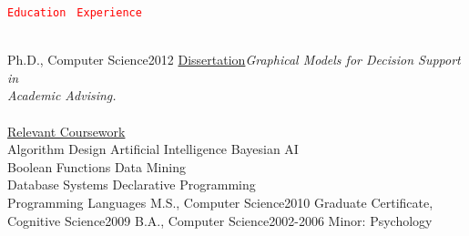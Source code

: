 \documentclass[
    10pt,
    A4,
    english,
    draft = false,
    twoside = false,
]{article}
\begin{document}
        {\textcolor{red}{\texttt{\Huge{E}\LARGE{ducation}\
} \hrulefill}}{\phantom{||||||}\textcolor{red}{\texttt{\Huge{E}\LARGE{xperience}\
} \hrulefill}}\\ \\
        \begin{minipage}[t]{0.49\textwidth}
	{Ph.D., Computer Science}{2012}
	{\underline{Dissertation}\newline \emph{Graphical Models for Decision Support in\\ Academic Advising.}\\\\
          \underline{Relevant Coursework}\\
        Algorithm Design \cvContactSep Artificial Intelligence \cvContactSep Bayesian AI \\ Boolean Functions \cvContactSep Data Mining  \\ Database Systems \cvContactSep Declarative Programming \\ Programming Languages}
        \vspace{-10pt}
        \CVBlockWithTime{}{}
	{M.S., Computer Science}{2010}
	{}
        \vspace{-20pt}
        \CVBlockWithTime{}{}
	{Graduate Certificate, Cognitive Science}{2009}
	{}
	{B.A., Computer Science}{2002-2006}
	{Minor: Psychology}
        \end{minipage}
\end{document}
